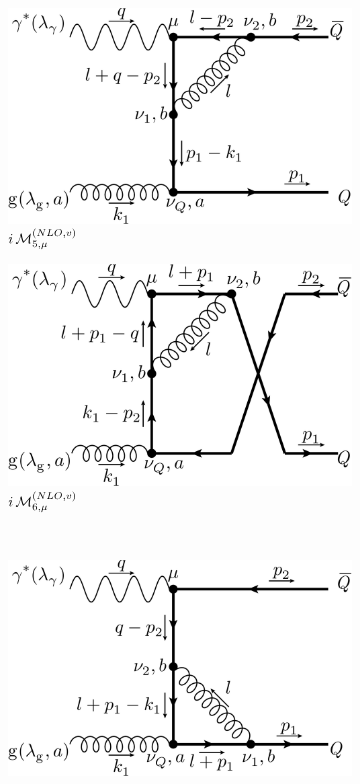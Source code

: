 \begin{figure}[ht!]
	\begin{subfigure}[t]{.4\textwidth}
		\includegraphics[width=\textwidth]{pyfeyn/nlo-v-e}
		\caption{$i\operatorname{\mathcal M}^{(NLO,v)}_{5,\mu}$}
	\end{subfigure}\hspace{.15\textwidth}%
	\begin{subfigure}[t]{.4\textwidth}
		\includegraphics[width=\textwidth]{pyfeyn/nlo-v-ecr}
		\caption{$i\operatorname{\mathcal M}^{(NLO,v)}_{6,\mu}$}
	\end{subfigure}\\
	\begin{subfigure}[t]{.4\textwidth}
		\includegraphics[width=\textwidth]{pyfeyn/nlo-v-g1}

\end{subfigure}
\end{figure}

